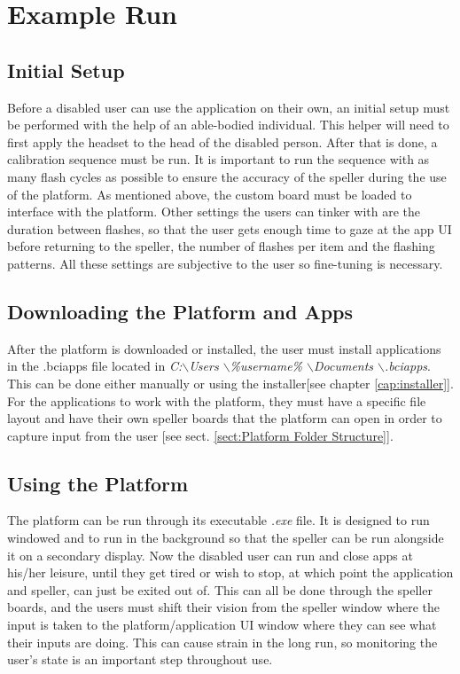 \section{Example Run} \label{sect:Example Run}
\subsection{Initial Setup}
Before a disabled user can use the application on their own, an initial setup must be performed with the help of an able-bodied individual. This helper will need to first apply the headset to the head of the disabled person. After that is done, a calibration sequence must be run. It is important to run the sequence with as many flash cycles as possible to ensure the accuracy of the speller during the use of the platform. As mentioned above, the custom board must be loaded to interface with the platform. Other settings the users can tinker with are the duration between flashes, so that the user gets enough time to gaze at the app UI before returning to the speller, the number of flashes per item and the flashing patterns. All these settings are subjective to the user so fine-tuning is necessary.

\subsection{Downloading the Platform and Apps}
After the platform is downloaded or installed, the user must install applications in the .bciapps file located in \textit{C:$\backslash$Users $\backslash$\%username\% $\backslash$Documents $\backslash$.bciapps}. This can be done either manually or using the installer[see chapter \ref{cap:installer}]. For the applications to work with the platform, they must have a specific file layout and have their own speller boards that the platform can open in order to capture input from the user [see sect. \ref{sect:Platform Folder Structure}].
\subsection{Using the Platform}
The platform can be run through its executable \textit{.exe} file. It is designed to run windowed and to run in the background so that the speller can be run alongside it on a secondary display. Now the disabled user can run and close apps at his/her leisure, until they get tired or wish to stop, at which point the application and speller, can just be exited out of. This can all be done through the speller boards, and the users must shift their vision from the speller window where the input is taken to the platform/application UI window where they can see what their inputs are doing. This can cause strain in the long run, so monitoring the user's state is an important step throughout use.

